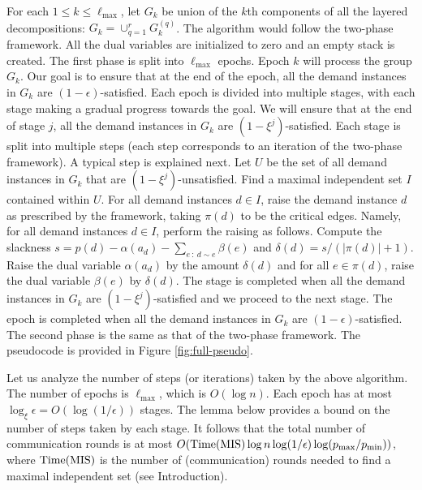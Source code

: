 \documentclass[11pt]{article}
\newcommand{\TMIS} {{\rm Time(MIS)}}
\begin{document}
For each $1\leq k\leq \ell_{\max}$, let $G_k$ be union of the $k$th components
of all the layered decompositions: $G_k = \cup_{q=1}^r G^{(q)}_k$.
The algorithm would follow the two-phase framework.
All the dual variables are initialized to zero and an empty stack is created.
The first phase is split into $\ell_{\max}$ epochs.
Epoch $k$ will process the group $G_k$. Our goal is to ensure that at the end of the epoch,
all the demand instances in $G_k$ are $(1-\epsilon)$-satisfied.
Each epoch is divided into multiple stages, with each stage making a gradual progress towards the goal.
We will ensure that at the end of stage $j$, all the demand instances in $G_k$ are $(1-\xi^j)$-satisfied.
Each stage is split into multiple steps (each step corresponds to an iteration of the two-phase framework).
A typical step is explained next.
Let $U$ be the set of all demand instances in $G_k$ that are $(1-\xi^j)$-unsatisfied.
Find a maximal independent set $I$ contained within $U$.
For all demand instances $d\in I$, raise the demand instance $d$ as prescribed by the framework,
taking $\pi(d)$ to be the critical edges.
Namely, for all demand instances $d\in I$, perform the raising as follows.
Compute the slackness $s=p(d)-\alpha(a_d)-\sum_{e~:~d\sim e} \beta(e)$
and $\delta(d) = s/(|\pi(d)|+1)$. Raise the dual variable $\alpha(a_d)$ by the amount $\delta(d)$
and for all $e\in \pi(d)$, raise the dual variable $\beta(e)$ by $\delta(d)$.
The stage is completed when all the demand instances in $G_k$ are $(1-\xi^j)$-satisfied
and we proceed to the next stage. The epoch is completed when all the demand instances in $G_k$
are $(1-\epsilon)$-satisfied. The second phase is the same as that of the two-phase framework.
The pseudocode is provided in Figure \ref{fig:full-pseudo}. 


Let us analyze the number of steps (or iterations) taken by the above algorithm.
The number of epochs is $\ell_{\max}$, which is $O(\log n)$.
Each epoch has at most $\log_{\xi}{\epsilon} = O(\log(1/\epsilon))$ stages.
The lemma below provides a bound on the number of steps taken by each stage.
It follows that the total number of communication rounds
is at most $O(\TMIS\log n\log(1/\epsilon)\log(p_{\max}/p_{\min}))$,
where $\TMIS$ is the number of (communication) rounds needed to find a maximal independent set (see Introduction).
\end{document}
